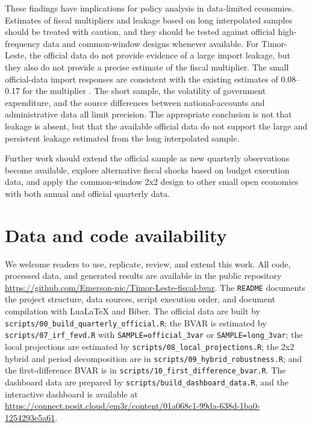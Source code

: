 \documentclass[11pt,a4paper]{article}
\begin{document}
These findings have implications for policy analysis in data-limited economies. Estimates of fiscal multipliers and leakage based on long interpolated samples should be treated with caution, and they should be tested against official high-frequency data and common-window designs whenever available. For Timor-Leste, the official data do not provide evidence of a large import leakage, but they also do not provide a precise estimate of the fiscal multiplier. The small official-data import responses are consistent with the existing estimates of 0.08--0.17 for the multiplier \parencite{worldbank2021,imf2024}. The short sample, the volatility of government expenditure, and the source differences between national-accounts and administrative data all limit precision. The appropriate conclusion is not that leakage is absent, but that the available official data do not support the large and persistent leakage estimated from the long interpolated sample.

Further work should extend the official sample as new quarterly observations become available, explore alternative fiscal shocks based on budget execution data, and apply the common-window 2x2 design to other small open economies with both annual and official quarterly data.

\section*{Data and code availability}
\label{sec:repro}

We welcome readers to use, replicate, review, and extend this work. All code, processed data, and generated results are available in the public repository \url{https://github.com/Emerson-nic/Timor-Leste-fiscal-bvar}. The \texttt{README} documents the project structure, data sources, script execution order, and document compilation with LuaLaTeX and Biber. The official data are built by \texttt{scripts/00\_build\_quarterly\_official.R}; the BVAR is estimated by \texttt{scripts/07\_irf\_fevd.R} with \texttt{SAMPLE=official\_3var} or \texttt{SAMPLE=long\_3var}; the local projections are estimated by \texttt{scripts/08\_local\_projections.R}; the 2x2 hybrid and period decomposition are in \texttt{scripts/09\_hybrid\_robustness.R}; and the first-difference BVAR is in \texttt{scripts/10\_first\_difference\_bvar.R}. The dashboard data are prepared by \texttt{scripts/build\_dashboard\_data.R}, and the interactive dashboard is available at \url{https://connect.posit.cloud/em3r/content/01a068c1-99da-638d-1ba0-1254293e5a61}.
\end{document}
